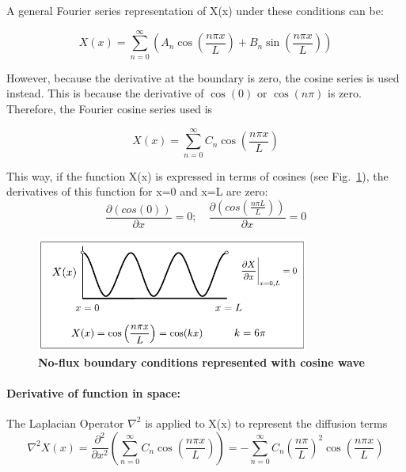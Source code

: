 A general Fourier series representation of X(x) under these conditions can be:

\begin{equation}
    X(x) = \sum_{n=0}^{\infty} \left( A_n \cos\left(\frac{n \pi x}{L}\right) + B_n \sin\left(\frac{n \pi x}{L}\right) \right)
\end{equation}

However, because the derivative at the boundary is zero, the cosine series is used instead.
This is because the derivative of $\cos(0)$ or $\cos(n\pi)$ is zero.
Therefore, the Fourier cosine series used is

\begin{equation}
    X(x) = \sum_{n=0}^{\infty}  C_n \cos\left(\frac{n \pi x}{L}\right)
    \label{cosine_series}
\end{equation}

This way, if the function X(x) is expressed in terms of cosines (see Fig.~\ref{fig:cos_boundary_conditions}), the derivatives of this function for x=0 and x=L are zero:
\begin{equation}
    \frac{\partial \left(cos(0)\right)}{\partial x} = 0 ; \quad \frac{\partial \left(cos(\frac{n \pi L}{L})\right)}{\partial x} = 0
    \end{equation}

\begin{figure}[H] %
    \centering
    \includegraphics[width=0.8\textwidth]{chapters/Chapter 1/cos_boundary_conditions} %
    \caption{\textbf{No-flux boundary conditions represented with cosine wave}}
    \label{fig:cos_boundary_conditions} %
\end{figure}

\paragraph{Derivative of function in space:}
The Laplacian Operator $\nabla^2$ is applied to X(x) to represent the diffusion terms
\begin{equation}
    \nabla^2 X(x) = \frac{\partial^2}{\partial x^2} \left(\sum_{n=0}^{\infty}  C_n \cos\left(\frac{n \pi x}{L}\right) \right)  = - \sum_{n=0}^{\infty}  C_n \left(\frac{n \pi }{L}\right)^2 \cos\left(\frac{n \pi x}{L}\right)
\end{equation}

